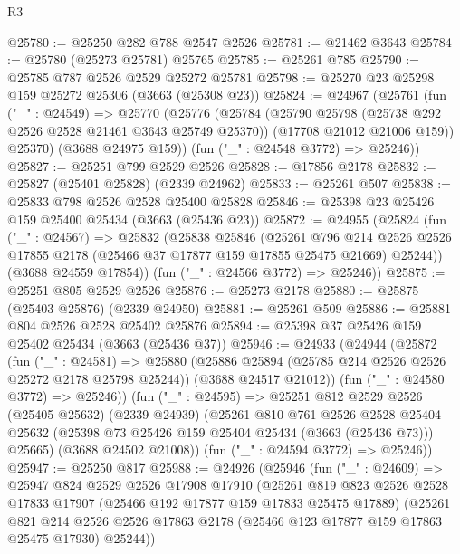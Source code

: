 \begin{lexlean}{R3}
\begin{coremodule}
@25780 := @25250 @282 @788 @2547 @2526
@25781 := @21462 @3643
@25784 := @25780 (@25273 @25781) @25765
@25785 := @25261 @785
@25790 := @25785 @787 @2526 @2529 @25272 @25781
@25798 := @25270 @23 @25298 @159 @25272 @25306 (@3663 (@25308 @23))
@25824 := @24967
    (@25761
      (fun ("_" : @24549) =>
      @25770
        (@25776
          (@25784
            (@25790 @25798 (@25738 @292 @2526 @2528 @21461 @3643 @25749 @25370))
            (@17708 @21012 @21006 @159))
          @25370)
        (@3688 @24975 @159))
      (fun ("_" : @24548 @3772) => @25246))
@25827 := @25251 @799 @2529 @2526
@25828 := @17856 @2178
@25832 := @25827 (@25401 @25828) (@2339 @24962)
@25833 := @25261 @507
@25838 := @25833 @798 @2526 @2528 @25400 @25828
@25846 := @25398 @23 @25426 @159 @25400 @25434 (@3663 (@25436 @23))
@25872 := @24955
    (@25824
      (fun ("_" : @24567) =>
      @25832
        (@25838
          @25846
          (@25261
            @796
            @214
            @2526
            @2526
            @17855
            @2178
            (@25466 @37 @17877 @159 @17855 @25475 @21669)
            @25244))
        (@3688 @24559 @17854))
      (fun ("_" : @24566 @3772) => @25246))
@25875 := @25251 @805 @2529 @2526
@25876 := @25273 @2178
@25880 := @25875 (@25403 @25876) (@2339 @24950)
@25881 := @25261 @509
@25886 := @25881 @804 @2526 @2528 @25402 @25876
@25894 := @25398 @37 @25426 @159 @25402 @25434 (@3663 (@25436 @37))
@25946 := @24933
    (@24944
      (@25872
        (fun ("_" : @24581) =>
        @25880
          (@25886 @25894 (@25785 @214 @2526 @2526 @25272 @2178 @25798 @25244))
          (@3688 @24517 @21012))
        (fun ("_" : @24580 @3772) => @25246))
      (fun ("_" : @24595) =>
      @25251
        @812
        @2529
        @2526
        (@25405 @25632)
        (@2339 @24939)
        (@25261
          @810
          @761
          @2526
          @2528
          @25404
          @25632
          (@25398 @73 @25426 @159 @25404 @25434 (@3663 (@25436 @73)))
          @25665)
        (@3688 @24502 @21008))
      (fun ("_" : @24594 @3772) => @25246))
@25947 := @25250 @817
@25988 := @24926
    (@25946
      (fun ("_" : @24609) =>
      @25947
        @824
        @2529
        @2526
        @17908
        @17910
        (@25261
          @819
          @823
          @2526
          @2528
          @17833
          @17907
          (@25466 @192 @17877 @159 @17833 @25475 @17889)
          (@25261
            @821
            @214
            @2526
            @2526
            @17863
            @2178
            (@25466 @123 @17877 @159 @17863 @25475 @17930)
            @25244))

\end{coremodule}
\end{lexlean}
